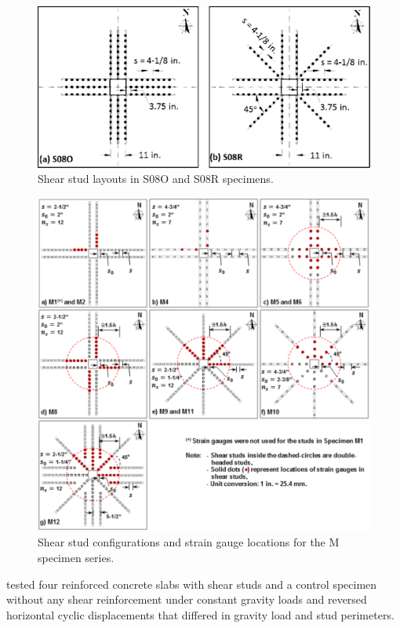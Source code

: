\begin{figure}\centering
    \includegraphics[width=\columnwidth]{Figures/d2016f2.pdf}
    \caption{Shear stud layouts in S08O and S08R specimens\citep{dam2016}.}
    \label{d2016f2}
    \end{figure}
    \begin{figure}\centering
        \includegraphics[width=\columnwidth]{Figures/d2017f3.pdf}
        \caption{Shear stud configurations and strain gauge locations for the M specimen series\citep{dam2017punching}.}
        \label{d2017f3}
        \end{figure}
\cite{isufi2018} tested four reinforced concrete slabs with shear studs and a control specimen without any shear reinforcement under constant gravity loads and reversed horizontal cyclic displacements that differed in gravity load and stud perimeters. 
